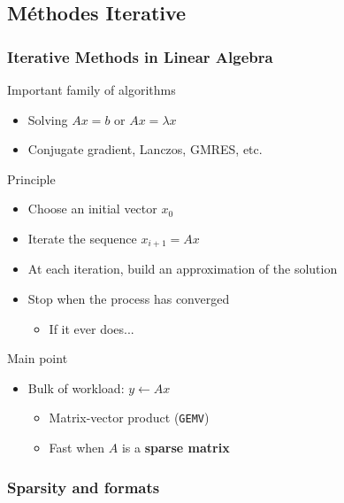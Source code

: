 \documentclass[xcolor={rgb,x11names,svgnames},rgb,x11names,svgnames]{beamer}
\newcommand{\red}{\alert}
\begin{document}
\subsection{Méthodes Iterative}


\begin{frame}
  \frametitle{Iterative Methods in Linear Algebra}

  Important family of algorithms
  \begin{itemize}
  \item Solving $Ax = b$ or $Ax = \lambda x$
  \item Conjugate gradient, Lanczos, GMRES, etc.
  \end{itemize}

  \begin{block}{Principle}
    \begin{itemize}
    \item Choose an initial vector $x_0$
    \item Iterate the sequence $x_{i+1} = Ax$
    \item At each iteration, build an approximation of the solution
    \item Stop when the process has converged
      \begin{itemize}
      \item If it ever does...
      \end{itemize}
    \end{itemize}    
  \end{block}

  \begin{exampleblock}{Main point}
    
    \begin{itemize}
    \item Bulk of workload: \red{$y \gets Ax$}
      \begin{itemize}
      \item Matrix-vector product (\texttt{GEMV})
      \item Fast when $A$ is a \alert{\textbf{sparse matrix}}
      \end{itemize}
    \end{itemize}
  \end{exampleblock}  
\end{frame}


\subsubsection{Sparsity and formats}
\end{document}
